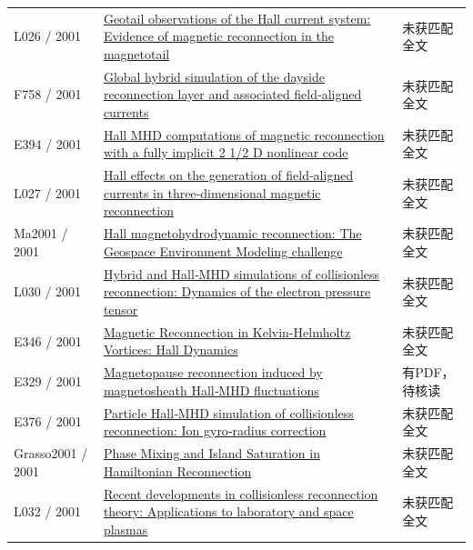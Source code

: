 \begin{longtable}{P{24mm}P{97mm}P{27mm}}
L026 / 2001 & \href{https://doi.org/10.1029/2001ja900038}{Geotail observations of the Hall current system: Evidence of magnetic reconnection in the magnetotail} & 未获匹配全文\\

F758 / 2001 & \href{https://doi.org/10.1029/2000ja000184}{Global hybrid simulation of the dayside reconnection layer and associated field‐aligned currents} & 未获匹配全文\\

E394 / 2001 & \href{http://ui.adsabs.harvard.edu/abs/2001AGUSM..SM31A06F/abstract}{Hall MHD computations of magnetic reconnection with a fully implicit 2 1/2 D nonlinear code} & 未获匹配全文\\

L027 / 2001 & \href{https://doi.org/10.1029/2000ja000290}{Hall effects on the generation of field‐aligned currents in three‐dimensional magnetic reconnection} & 未获匹配全文\\

Ma2001 / 2001 & \href{https://doi.org/10.1029/1999ja001004}{Hall magnetohydrodynamic reconnection: The Geospace Environment Modeling challenge} & 未获匹配全文\\

L030 / 2001 & \href{https://doi.org/10.1029/2000ja000398}{Hybrid and Hall‐MHD simulations of collisionless reconnection: Dynamics of the electron pressure tensor} & 未获匹配全文\\

E346 / 2001 & \href{http://ui.adsabs.harvard.edu/abs/2001AGUFMSM41B0811N/abstract}{Magnetic Reconnection in Kelvin-Helmholtz Vortices: Hall Dynamics} & 未获匹配全文\\

E329 / 2001 & \href{https://doi.org/10.1029/2000ja900151}{Magnetopause reconnection induced by magnetosheath Hall‐MHD fluctuations} & 有PDF，待核读\\

E376 / 2001 & \href{https://doi.org/10.1029/2000gl012797}{Particle Hall‐MHD simulation of collisionless reconnection: Ion gyro‐radius correction} & 未获匹配全文\\

Grasso2001 / 2001 & \href{https://doi.org/10.1103/physrevlett.86.5051}{Phase Mixing and Island Saturation in Hamiltonian Reconnection} & 未获匹配全文\\

L032 / 2001 & \href{https://doi.org/10.1063/1.1353803}{Recent developments in collisionless reconnection theory: Applications to laboratory and space plasmas} & 未获匹配全文\\


\end{longtable}
